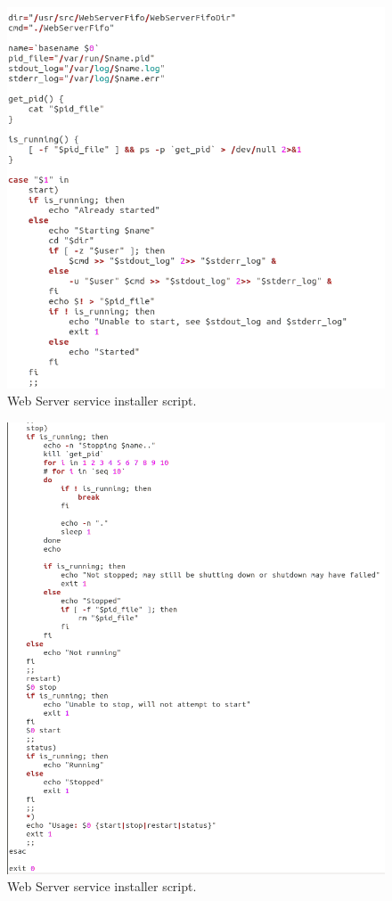 \documentclass{article}
\begin{document}
\begin{figure}[H]
	\centering
	\captionsetup{justification=centering, margin=1cm}
    \includegraphics[width = \columnwidth]{installweb1.png}
    \caption{Web Server service installer script.}
	\label{fig:installweb1}
\end{figure}
\begin{figure}[H]
	\centering
	\captionsetup{justification=centering, margin=1cm}
    \includegraphics[width = \columnwidth]{installweb2.png}
    \caption{Web Server service installer script.}
	\label{fig:installweb2}
\end{figure}
\end{document}
